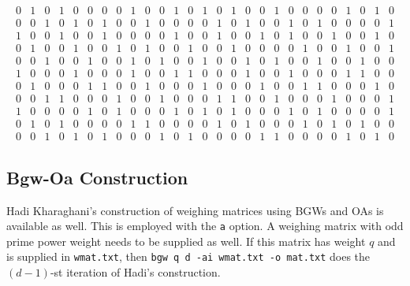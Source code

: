 \documentclass[a4paper,10pt]{article}
\begin{document}
\[\begin{array}{rrrrrrrrrrrrrrrrrrrrrrrrrrr}
0 & 1 & 0 & 1 & 0 & 0 & 0 & 0 & 1 & 0 & 0 & 1 & 0 & 1 & 0 & 1 & 0 & 0 & 1 & 0 & 0 & 0 & 0 & 1 & 0 & 1 & 0 \\
0 & 0 & 1 & 0 & 1 & 0 & 1 & 0 & 0 & 1 & 0 & 0 & 0 & 0 & 1 & 0 & 1 & 0 & 0 & 1 & 0 & 1 & 0 & 0 & 0 & 0 & 1 \\
1 & 0 & 0 & 1 & 0 & 0 & 1 & 0 & 0 & 0 & 0 & 1 & 0 & 0 & 1 & 0 & 0 & 1 & 0 & 1 & 0 & 0 & 1 & 0 & 0 & 1 & 0 \\
0 & 1 & 0 & 0 & 1 & 0 & 0 & 1 & 0 & 1 & 0 & 0 & 1 & 0 & 0 & 1 & 0 & 0 & 0 & 0 & 1 & 0 & 0 & 1 & 0 & 0 & 1 \\
0 & 0 & 1 & 0 & 0 & 1 & 0 & 0 & 1 & 0 & 1 & 0 & 0 & 1 & 0 & 0 & 1 & 0 & 1 & 0 & 0 & 1 & 0 & 0 & 1 & 0 & 0 \\
1 & 0 & 0 & 0 & 1 & 0 & 0 & 0 & 1 & 0 & 0 & 1 & 1 & 0 & 0 & 0 & 1 & 0 & 0 & 1 & 0 & 0 & 0 & 1 & 1 & 0 & 0 \\
0 & 1 & 0 & 0 & 0 & 1 & 1 & 0 & 0 & 1 & 0 & 0 & 0 & 1 & 0 & 0 & 0 & 1 & 0 & 0 & 1 & 1 & 0 & 0 & 0 & 1 & 0 \\
0 & 0 & 1 & 1 & 0 & 0 & 0 & 1 & 0 & 0 & 1 & 0 & 0 & 0 & 1 & 1 & 0 & 0 & 1 & 0 & 0 & 0 & 1 & 0 & 0 & 0 & 1 \\
1 & 0 & 0 & 0 & 0 & 1 & 0 & 1 & 0 & 0 & 0 & 1 & 0 & 1 & 0 & 1 & 0 & 0 & 0 & 1 & 0 & 1 & 0 & 0 & 0 & 0 & 1 \\
0 & 1 & 0 & 1 & 0 & 0 & 0 & 0 & 1 & 1 & 0 & 0 & 0 & 0 & 1 & 0 & 1 & 0 & 0 & 0 & 1 & 0 & 1 & 0 & 1 & 0 & 0 \\
0 & 0 & 1 & 0 & 1 & 0 & 1 & 0 & 0 & 0 & 1 & 0 & 1 & 0 & 0 & 0 & 0 & 1 & 1 & 0 & 0 & 0 & 0 & 1 & 0 & 1 & 0
\end{array}
\]

\subsection{\sc Bgw-Oa Construction}
Hadi Kharaghani's construction of weighing matrices using BGWs and OAs is available as well. This is employed with the {\tt a} option. A weighing matrix with odd prime power weight needs to be supplied as well. If this matrix has weight $q$ and is supplied in {\tt wmat.txt}, then {\tt bgw q d -ai wmat.txt -o mat.txt} does the $(d-1)$-st iteration of Hadi's construction. 
\end{document}

